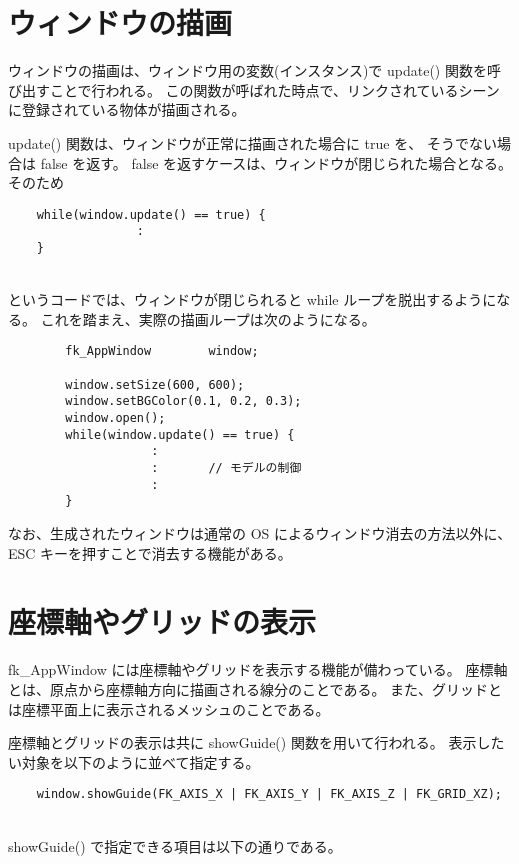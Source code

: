 \section{ウィンドウの描画}
ウィンドウの描画は、ウィンドウ用の変数(インスタンス)で update() 関数を呼び出すことで行われる。
この関数が呼ばれた時点で、リンクされているシーンに登録されている物体が描画される。

update() 関数は、ウィンドウが正常に描画された場合に true を、
そうでない場合は false を返す。
false を返すケースは、ウィンドウが閉じられた場合となる。
そのため
\\
\begin{screen}
\begin{verbatim}
    while(window.update() == true) {
                  :
    }
\end{verbatim}
\end{screen}
~ \\
というコードでは、ウィンドウが閉じられると while ループを脱出するようになる。
これを踏まえ、実際の描画ループは次のようになる。
\\
\begin{breakbox}
\begin{verbatim}
        fk_AppWindow        window;

        window.setSize(600, 600);
        window.setBGColor(0.1, 0.2, 0.3);
        window.open();
        while(window.update() == true) {
                    :
                    :       // モデルの制御
                    :
        }       
\end{verbatim}
\end{breakbox}

なお、生成されたウィンドウは通常の OS によるウィンドウ消去の方法以外に、
ESC キーを押すことで消去する機能がある。

\section{座標軸やグリッドの表示}
fk\_AppWindow には座標軸やグリッドを表示する機能が備わっている。
座標軸とは、原点から座標軸方向に描画される線分のことである。
また、グリッドとは座標平面上に表示されるメッシュのことである。

座標軸とグリッドの表示は共に showGuide() 関数を用いて行われる。
表示したい対象を以下のように並べて指定する。
\\
\begin{screen}
\begin{verbatim}
    window.showGuide(FK_AXIS_X | FK_AXIS_Y | FK_AXIS_Z | FK_GRID_XZ);
\end{verbatim}
\end{screen}
~ \\
showGuide() で指定できる項目は以下の通りである。

